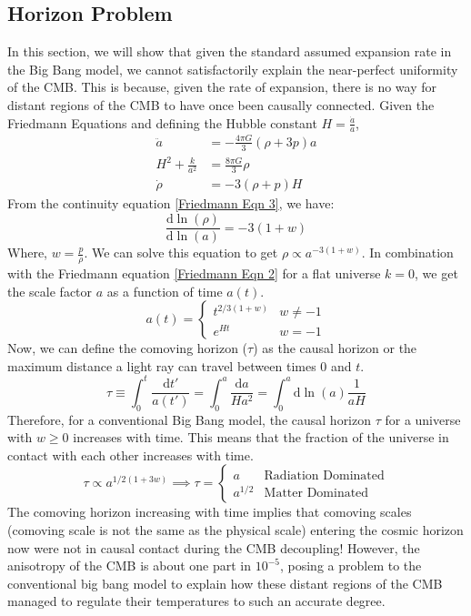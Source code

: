 \documentclass[aps,prd,reprint,preprintnumbers,showpacs,floatfix,nofootinbib,superscript address]{revtex4-2}
\begin{document}
\subsection{Horizon Problem} \label{Horizon Problem}
In this section, we will show that given the standard assumed expansion rate in the Big Bang model, we cannot satisfactorily explain the near-perfect uniformity of the CMB. This is because, given the rate of expansion, there is no way for distant regions of the CMB to have once been causally connected.
Given the Friedmann Equations and defining the Hubble constant $H = \frac{\dot{a}}{a}$,
\begin{align}    
    \ddot{a} &= -\frac{4\pi G}{3} (\rho + 3p)a \label{Friedmann Eqn 1} \\
    H^2 + \frac{k}{a^2} &= \frac{8 \pi G}{3} \rho \label{Friedmann Eqn 2} \\
    \dot{\rho} &= -3(\rho + p)H \label{Friedmann Eqn 3}
\end{align}
From the continuity equation \ref{Friedmann Eqn 3}, we have:
\begin{equation} \label{4}
    \frac{\mathrm{d}  \ln(\rho)}{\mathrm{d} \ln(a)} = -3(1+w)
\end{equation}
Where, $w = \frac{p}{\rho}$. We can solve this equation to get $\rho \propto a^{-3(1+w)}$. In combination with the Friedmann equation \ref{Friedmann Eqn 2} for a flat universe $k = 0$, we get the scale factor $a$ as a function of time $a(t)$.
\begin{equation}    \label{5}
    a(t) = \begin{cases}
        t^{2/3(1+w)} & w \neq -1 \\
        e^{Ht} & w = -1
    \end{cases}
\end{equation}
Now, we can define the comoving horizon ($\tau$) as the causal horizon or the maximum distance a light ray can travel between times 0 and $t$.
\begin{equation}    \label{6}
    \tau \equiv \int_{0}^{t} \frac{\mathrm{d} t'}{a(t')} = \int_{0}^{a} \frac{\mathrm{d}a}{H a^2} = \int_{0}^{a} \mathrm{d} \ln(a) \frac{1}{aH}
\end{equation}
Therefore, for a conventional Big Bang model, the causal horizon $\tau$ for a universe with $w \geq 0$ increases with time. This means that the fraction of the universe in contact with each other increases with time.
\begin{equation}
    \tau \propto a^{1/2(1+3w)} \implies \tau = \begin{cases}
        a & \text{Radiation Dominated} \\
        a^{1/2} & \text{Matter Dominated}
    \end{cases}
\end{equation}
The comoving horizon increasing with time implies that comoving scales (comoving scale is not the same as the physical scale) entering the cosmic horizon now were not in causal contact during the CMB decoupling! However, the anisotropy of the CMB is about one part in $10^{-5}$, posing a problem to the conventional big bang model to explain how these distant regions of the CMB managed to regulate their temperatures to such an accurate degree.
\end{document}
